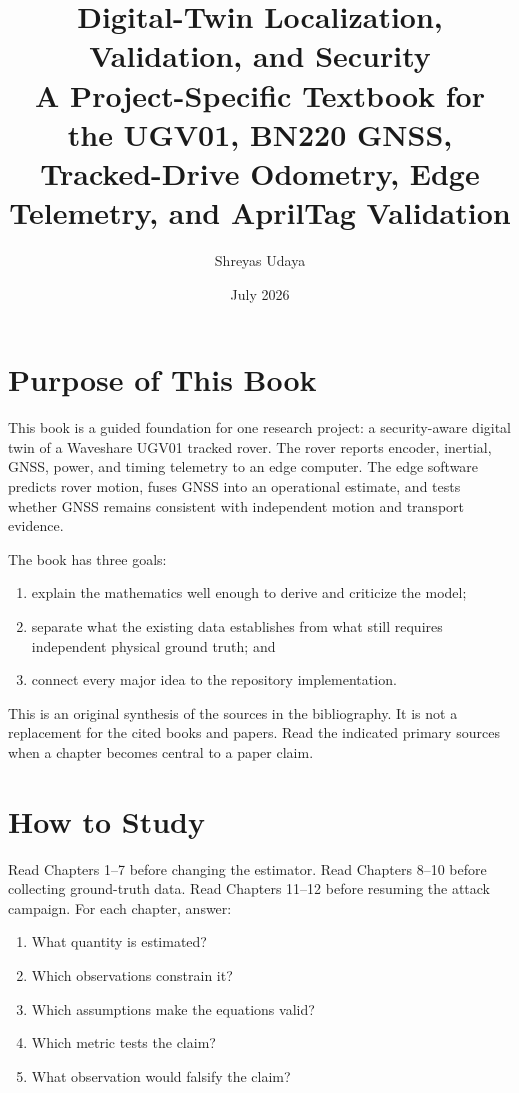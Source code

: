 \documentclass[11pt,oneside]{book}
\title{\textbf{Digital-Twin Localization, Validation, and Security}\\
\large A Project-Specific Textbook for the UGV01, BN220 GNSS,\\
Tracked-Drive Odometry, Edge Telemetry, and AprilTag Validation}
\author{Shreyas Udaya}
\date{July 2026}
\begin{document}
\frontmatter
\maketitle

\chapter*{Purpose of This Book}

This book is a guided foundation for one research project: a security-aware
digital twin of a Waveshare UGV01 tracked rover. The rover reports encoder,
inertial, GNSS, power, and timing telemetry to an edge computer. The edge
software predicts rover motion, fuses GNSS into an operational estimate, and
tests whether GNSS remains consistent with independent motion and transport
evidence.

The book has three goals:
\begin{enumerate}
  \item explain the mathematics well enough to derive and criticize the model;
  \item separate what the existing data establishes from what still requires
  independent physical ground truth; and
  \item connect every major idea to the repository implementation.
\end{enumerate}

This is an original synthesis of the sources in the bibliography. It is not a
replacement for the cited books and papers. Read the indicated primary sources
when a chapter becomes central to a paper claim.

\chapter*{How to Study}

Read Chapters 1--7 before changing the estimator. Read Chapters 8--10 before
collecting ground-truth data. Read Chapters 11--12 before resuming the attack
campaign. For each chapter, answer:
\begin{enumerate}
  \item What quantity is estimated?
  \item Which observations constrain it?
  \item Which assumptions make the equations valid?
  \item Which metric tests the claim?
  \item What observation would falsify the claim?
\end{enumerate}
\end{document}
